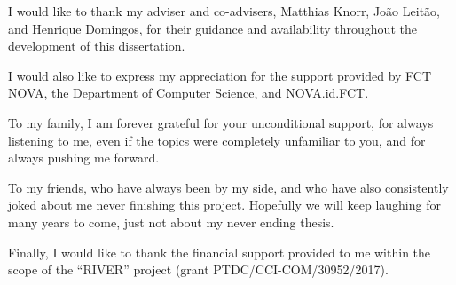 %

\begin{ntacknowledgements}

I would like to thank my adviser and co-advisers, Matthias Knorr, João Leitão, and Henrique Domingos, for their guidance and availability throughout the development of this dissertation.

I would also like to express my appreciation for the support provided by FCT NOVA, the Department of Computer Science, and NOVA.id.FCT.

To my family, I am forever grateful for your unconditional support, for always listening to me, even if the topics were completely unfamiliar to you, and for always pushing me forward.

To my friends, who have always been by my side, and who have also consistently joked about me never finishing this project. Hopefully we will keep laughing for many years to come, just not about my never ending thesis. 

Finally, I would like to thank the financial support provided to me within the scope of the “RIVER” project (grant PTDC/CCI-COM/30952/2017).

\end{ntacknowledgements}